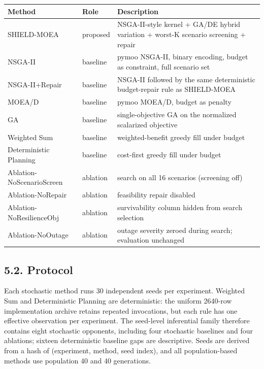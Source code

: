 \documentclass[
  10pt,
  a4paper,
]{article}
\begin{document}
\begin{longtable}[]{@{}
  >{\raggedright\arraybackslash}p{}
  >{\raggedright\arraybackslash}p{}
  >{\raggedright\arraybackslash}p{}@{}}
\toprule\noalign{}
\begin{minipage}[b]{\linewidth}\raggedright
Method
\end{minipage} & \begin{minipage}[b]{\linewidth}\raggedright
Role
\end{minipage} & \begin{minipage}[b]{\linewidth}\raggedright
Description
\end{minipage} \\
\midrule\noalign{}
\endhead
\bottomrule\noalign{}
\endlastfoot
SHIELD-MOEA & proposed & NSGA-II-style kernel + GA/DE hybrid variation +
worst-K scenario screening + repair \\
NSGA-II & baseline & pymoo NSGA-II, binary encoding, budget as
constraint, full scenario set \\
NSGA-II+Repair & baseline & NSGA-II followed by the same deterministic
budget-repair rule as SHIELD-MOEA \\
MOEA/D & baseline & pymoo MOEA/D, budget as penalty \\
GA & baseline & single-objective GA on the normalized scalarized
objective \\
Weighted Sum & baseline & weighted-benefit greedy fill under budget \\
Deterministic Planning & baseline & cost-first greedy fill under
budget \\
Ablation-NoScenarioScreen & ablation & search on all 16 scenarios
(screening off) \\
Ablation-NoRepair & ablation & feasibility repair disabled \\
Ablation-NoResilienceObj & ablation & survivability column hidden from
search selection \\
Ablation-NoOutage & ablation & outage severity zeroed during search;
evaluation unchanged \\
\end{longtable}

\subsection{5.2. Protocol}\label{protocol}

Each stochastic method runs 30 independent seeds per experiment.
Weighted Sum and Deterministic Planning are deterministic: the uniform
2640-row implementation archive retains repeated invocations, but each
rule has one effective observation per experiment. The seed-level
inferential family therefore contains eight stochastic opponents,
including four stochastic baselines and four ablations; sixteen
deterministic baseline gaps are descriptive. Seeds are derived from a
hash of (experiment, method, seed index), and all population-based
methods use population 40 and 40 generations.
\end{document}
